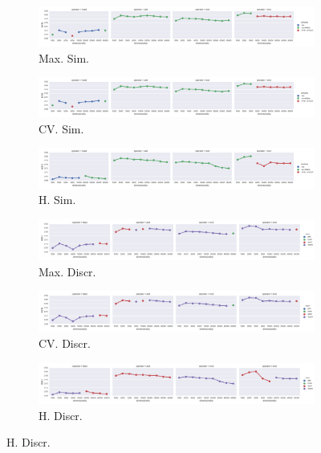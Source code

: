 \begin{landscape}
\begin{figure}
  \begin{subfigure}[t]{0.49\textwidth}
    \includegraphics[width=\textwidth]{supplement/figures/KS14-max_-selection-similarity}
    \caption{Max. Sim.}
    \label{fig:}
  \end{subfigure}
  \begin{subfigure}[t]{0.49\textwidth}
    \includegraphics[width=\textwidth]{supplement/figures/KS14-cross_validation-selection-similarity}
    \caption{CV. Sim.}
    \label{fig:}
  \end{subfigure}
  \begin{subfigure}[t]{0.49\textwidth}
    \includegraphics[width=\textwidth]{supplement/figures/KS14-heuristics-selection-similarity}
    \caption{H. Sim.}
    \label{fig:}
  \end{subfigure}

  \begin{subfigure}[t]{0.49\textwidth}
    \includegraphics[width=\textwidth]{supplement/figures/KS14-max_-selection-discr}
    \caption{Max. Discr.}
    \label{fig:}
  \end{subfigure}
  \begin{subfigure}[t]{0.49\textwidth}
    \includegraphics[width=\textwidth]{supplement/figures/KS14-cross_validation-selection-discr}
    \caption{CV. Discr.}
    \label{fig:}
  \end{subfigure}
  \begin{subfigure}[t]{0.49\textwidth}
    \includegraphics[width=\textwidth]{supplement/figures/KS14-heuristics-selection-discr}
    \caption{H. Discr.}
    \label{fig:}
  \end{subfigure}



\end{figure}
\end{landscape}

